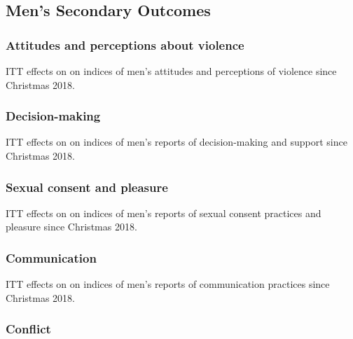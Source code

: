 \documentclass[11pt,english]{article}
\begin{document}
\subsection{Men's Secondary Outcomes}

\subsubsection{Attitudes and perceptions about violence}

\begin{table}[H]
\centering

\caption{ITT effects on on indices of men's attitudes and perceptions of violence since Christmas 2018.}
\label{tab:attitudes_results_m}
\end{table}

\subsubsection{Decision-making}

\begin{table}[H]
\centering

\caption{ITT effects on on indices of men's reports of decision-making and support since Christmas 2018.}
\label{tab:dm_etc_results_m}
\end{table}

\subsubsection{Sexual consent and pleasure}

\begin{table}[H]
\centering

\caption{ITT effects on on indices of men's reports of sexual consent practices and pleasure since Christmas 2018.}
\label{tab:sex_results_m}
\end{table}

\subsubsection{Communication}

\begin{table}[H]
\centering

\caption{ITT effects on on indices of men's reports of communication practices since Christmas 2018.}
\label{tab:comm_results_m}
\end{table}

\subsubsection{Conflict}
\end{document}
